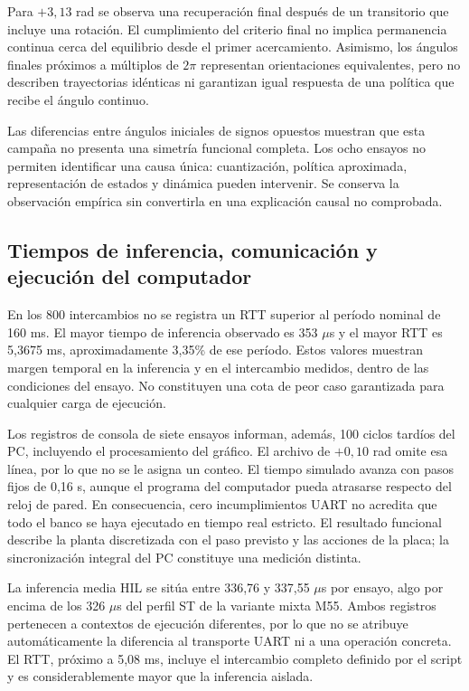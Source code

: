 Para $+3{,}13$ rad se observa una recuperación final después de un transitorio que incluye una rotación. El cumplimiento del criterio final no implica permanencia continua cerca del equilibrio desde el primer acercamiento. Asimismo, los ángulos finales próximos a múltiplos de $2\pi$ representan orientaciones equivalentes, pero no describen trayectorias idénticas ni garantizan igual respuesta de una política que recibe el ángulo continuo.

Las diferencias entre ángulos iniciales de signos opuestos muestran que esta campaña no presenta una simetría funcional completa. Los ocho ensayos no permiten identificar una causa única: cuantización, política aproximada, representación de estados y dinámica pueden intervenir. Se conserva la observación empírica sin convertirla en una explicación causal no comprobada.

\FloatBarrier
\subsection{Tiempos de inferencia, comunicación y ejecución del computador}


En los 800 intercambios no se registra un RTT superior al período nominal de 160 ms. El mayor tiempo de inferencia observado es 353 $\mu$s y el mayor RTT es 5,3675 ms, aproximadamente 3,35\% de ese período. Estos valores muestran margen temporal en la inferencia y en el intercambio medidos, dentro de las condiciones del ensayo. No constituyen una cota de peor caso garantizada para cualquier carga de ejecución.

Los registros de consola de siete ensayos informan, además, 100 ciclos tardíos del PC, incluyendo el procesamiento del gráfico. El archivo de $+0{,}10$ rad omite esa línea, por lo que no se le asigna un conteo. El tiempo simulado avanza con pasos fijos de 0,16 s, aunque el programa del computador pueda atrasarse respecto del reloj de pared. En consecuencia, cero incumplimientos UART no acredita que todo el banco se haya ejecutado en tiempo real estricto. El resultado funcional describe la planta discretizada con el paso previsto y las acciones de la placa; la sincronización integral del PC constituye una medición distinta.

La inferencia media HIL se sitúa entre 336,76 y 337,55 $\mu$s por ensayo, algo por encima de los 326 $\mu$s del perfil ST de la variante mixta M55. Ambos registros pertenecen a contextos de ejecución diferentes, por lo que no se atribuye automáticamente la diferencia al transporte UART ni a una operación concreta. El RTT, próximo a 5,08 ms, incluye el intercambio completo definido por el script y es considerablemente mayor que la inferencia aislada.

